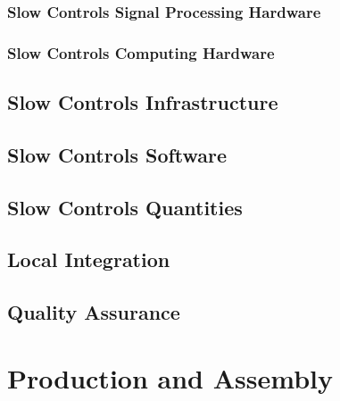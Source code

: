 \subsubsection{Slow Controls Signal Processing Hardware}

\subsubsection{Slow Controls Computing Hardware}


\subsection{Slow Controls Infrastructure}
\label{sec:fddp-slow-cryo-slow-infra}

\subsection{Slow Controls Software}
\label{sec:fddp-slow-cryo-sw}

\subsection{Slow Controls Quantities}
\label{sec:fddp-slow-cryo-quant}

\subsection{Local Integration}
\label{sec:fddp-slow-cryo-slow-loc-integ}

\subsection{Quality Assurance}
\label{sec:fddp-slow-cryo-slow-qa}



\section{Production and Assembly}
\label{sec:fddp-slow-cryo-prod-assy}




